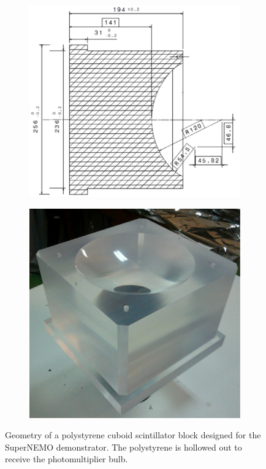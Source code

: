 \begin{figure}[!h]
  \centering
  \begin{subfigure}[t]{0.49\textwidth}
    \centering
    \includegraphics[height=0.95\textwidth]{SNdemonstrator/fig_SNdemonstrator/scintillator_plan.pdf}
  \end{subfigure}
  \hfill
  \begin{subfigure}[t]{0.49\textwidth}
    \centering
    \includegraphics[height=0.95\textwidth]{SNdemonstrator/fig_SNdemonstrator/scintillator_pic.pdf}
  \end{subfigure}
  \caption{Geometry of a polystyrene cuboid scintillator block designed for the SuperNEMO demonstrator.
    The polystyrene is hollowed out to receive the photomultiplier bulb.
    \label{fig:scintillator_design}}
\end{figure}

